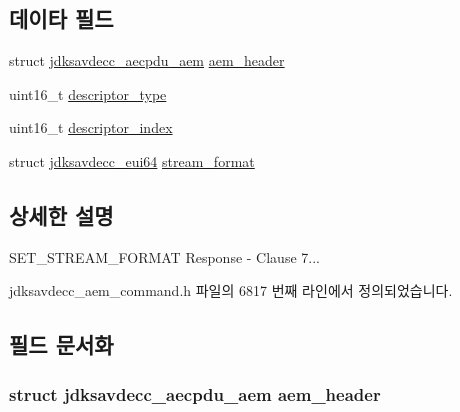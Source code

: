 \subsection*{데이타 필드}
\begin{DoxyCompactItemize}
\item 
struct \hyperlink{structjdksavdecc__aecpdu__aem}{jdksavdecc\+\_\+aecpdu\+\_\+aem} \hyperlink{structjdksavdecc__aem__command__set__stream__format__response_ae1e77ccb75ff5021ad923221eab38294}{aem\+\_\+header}
\item 
uint16\+\_\+t \hyperlink{structjdksavdecc__aem__command__set__stream__format__response_ab7c32b6c7131c13d4ea3b7ee2f09b78d}{descriptor\+\_\+type}
\item 
uint16\+\_\+t \hyperlink{structjdksavdecc__aem__command__set__stream__format__response_a042bbc76d835b82d27c1932431ee38d4}{descriptor\+\_\+index}
\item 
struct \hyperlink{structjdksavdecc__eui64}{jdksavdecc\+\_\+eui64} \hyperlink{structjdksavdecc__aem__command__set__stream__format__response_a77359be54ea386b1da66597746709ed0}{stream\+\_\+format}
\end{DoxyCompactItemize}


\subsection{상세한 설명}
S\+E\+T\+\_\+\+S\+T\+R\+E\+A\+M\+\_\+\+F\+O\+R\+M\+AT Response -\/ Clause 7... 

jdksavdecc\+\_\+aem\+\_\+command.\+h 파일의 6817 번째 라인에서 정의되었습니다.



\subsection{필드 문서화}
\subsubsection[{\texorpdfstring{aem\+\_\+header}{aem_header}}]{\setlength{\rightskip}{0pt plus 5cm}struct {\bf jdksavdecc\+\_\+aecpdu\+\_\+aem} aem\+\_\+header}\hypertarget{structjdksavdecc__aem__command__set__stream__format__response_ae1e77ccb75ff5021ad923221eab38294}{}\label{structjdksavdecc__aem__command__set__stream__format__response_ae1e77ccb75ff5021ad923221eab38294}


